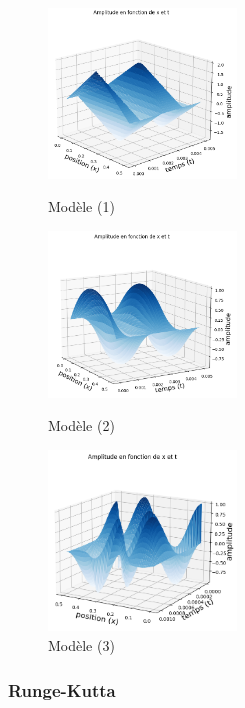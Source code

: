 \begin{figure}[H]
  \includegraphics[width=5cm]{3.png}
  \caption{Modèle (1)}\label{fig}
\endminipage\hfill
{}
  \includegraphics[width=5cm]{4.png}
  \caption{Modèle (2)}\label{fig}
\endminipage\hfill
{}%
  \includegraphics[width=5cm]{8_implicite.png}
  \caption{Modèle (3)}\label{fig}
\endminipage
\end{figure}


\subsubsection{Runge-Kutta}
   
